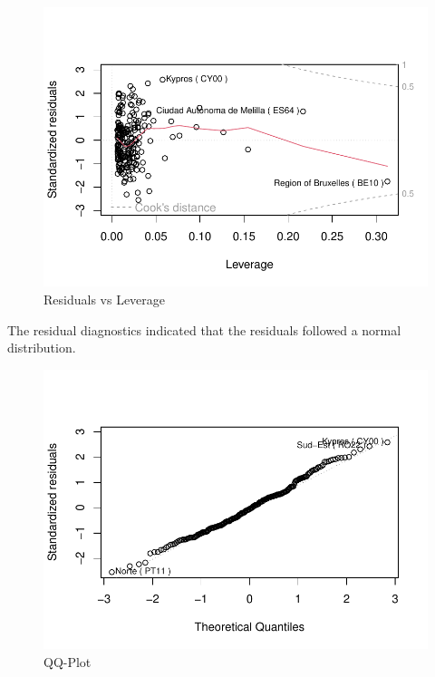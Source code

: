 \documentclass[
  letterpaper,
  DIV=11,
  numbers=noendperiod,
  abstract]{scrartcl}
\begin{document}
\begin{figure}[H]

{\centering \includegraphics[width=1\textwidth,height=\textheight]{report_files/figure-pdf/residualsvsleverage_sel-1.pdf}

}

\caption{Residuals vs Leverage}

\end{figure}%

The residual diagnostics indicated that the residuals followed a normal
distribution.

\begin{figure}[H]

{\centering \includegraphics[width=1\textwidth,height=\textheight]{report_files/figure-pdf/qqplot_sel-1.pdf}

}

\caption{QQ-Plot}

\end{figure}%
\end{document}

